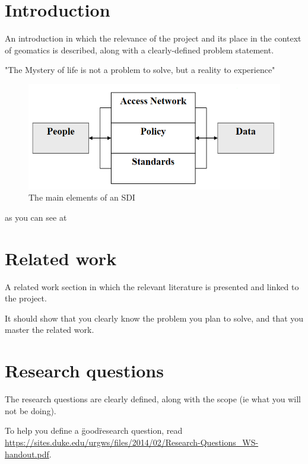 \section{Introduction}
An introduction in which the relevance of the project and its place in the context of geomatics is described, along with a clearly-defined problem statement.

"The Mystery of life is not a problem to solve, but a reality to experience"\cite{einstein}


\begin{figure}
    \centering
    \includegraphics[width=12cm]{images/test.png}
    \caption{The main elements of an SDI}
    \label{thingie}
\end{figure}

as you can see at  


\section{Related work}
A related work section in which the relevant literature is presented and linked to the project.

It should show that you clearly know the problem you plan to solve, and that you master the related work. 

\section{Research questions}
The research questions are clearly defined, along with the scope (ie what you will not be doing).

To help you define a \"good\" research question, 
read \url{https://sites.duke.edu/urgws/files/2014/02/Research-Questions_WS-handout.pdf}.


